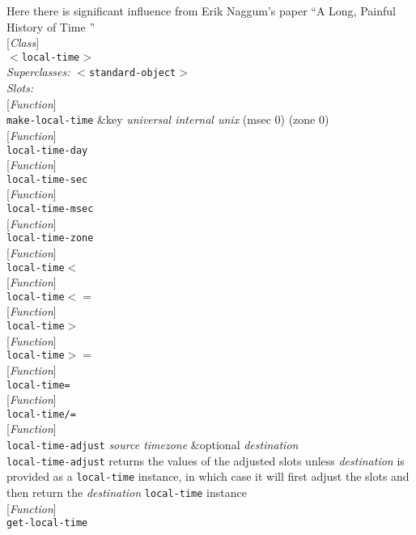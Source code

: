 \documentclass[10pt]{book}
\newenvironment{defother}[2]{[\textit{#1}]\\\texttt{#2}}{\\}
\newenvironment{defun}[1]{\begin{defother}{Function}{#1}}{\end{defother}}
\newenvironment{defclass}[2]{[\textit{Class}]\\\texttt{#1}\\\textit{Superclasses:} \texttt{#2}\\\textit{Slots:}}{\\}
\begin{document}
Here there is significant influence from Erik Naggum's paper ``A Long, Painful History of Time ''\\
\begin{defclass}{$<$local-time$>$}{$<$standard-object$>$}\end{defclass}
\begin{defun}{make-local-time} \&key \textit{universal internal unix} (msec 0) (zone 0)\end{defun}
\begin{defun}{local-time-day}\end{defun}
\begin{defun}{local-time-sec}\end{defun}
\begin{defun}{local-time-msec}\end{defun}
\begin{defun}{local-time-zone}\end{defun}
\begin{defun}{local-time$<$}\end{defun}
\begin{defun}{local-time$<=$}\end{defun}
\begin{defun}{local-time$>$}\end{defun}
\begin{defun}{local-time$>=$}\end{defun}
\begin{defun}{local-time=}\end{defun}
\begin{defun}{local-time/=}\end{defun}
\begin{defun}{local-time-adjust} \textit{source timezone} \&optional \textit{destination}\\
\texttt{local-time-adjust} returns the values of the adjusted slots unless \textit{destination} is provided as a \texttt{local-time} instance, in which case it will first adjust the slots and then return the \textit{destination} \texttt{local-time} instance\end{defun}
\begin{defun}{get-local-time}\end{defun}
\end{document}
